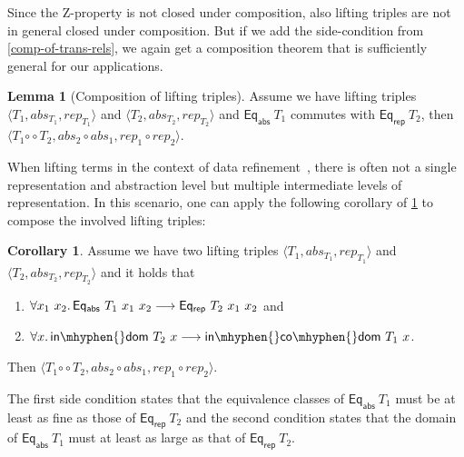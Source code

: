 \documentclass{article}
\theoremstyle{definition}
\newtheorem{lemma}[definition]{Lemma}
\newtheorem{corollary}[definition]{Corollary}
\newcommand{\relcomp}{\mathbin{\circ\circ}}
\newcommand{\indom}{\mathsf{in\mhyphen{}dom}}
\newcommand{\incodom}{\mathsf{in\mhyphen{}co\mhyphen{}dom}}
\newcommand{\eqrep}{\mathsf{Eq_{rep}}}
\newcommand{\eqabs}{\mathsf{Eq_{abs}}}
\begin{document}
Since the Z-property is not closed under composition,
also lifting triples are not in general closed under composition.
But if we add the side-condition from \cref{comp-of-trans-rels},
we again get a composition theorem that is sufficiently general for our applications.
\begin{lemma}[Composition of lifting triples]\label{lem:comp-of-lift-trips}
Assume we have lifting triples
$\langle T_1, abs_{T_1}, rep_{T_1} \rangle$ and $\langle T_2, abs_{T_2}, rep_{T_2} \rangle$
and \(\eqabs\ T_1\) commutes with \( \eqrep\ T_2 \),
then $\langle T_1 \relcomp T_2, abs_2 \circ abs_1, rep_1 \circ rep_2 \rangle$.
\end{lemma}

When lifting terms in the context of data refinement~\cite{haftmann2013data,lammich2013automatic},
there is often not a single representation and abstraction level
but multiple intermediate levels of representation.
In this scenario, one can apply the following corollary of \cref{lem:comp-of-lift-trips} to compose the involved lifting triples:
\begin{corollary}
Assume we have two lifting triples $\langle T_1, abs_{T_1}, rep_{T_1} \rangle$ and $\langle T_2, abs_{T_2}, rep_{T_2} \rangle$ and it holds that
\begin{enumerate}
	\item \(\forall x_1\ x_2\ldotp \eqabs\ T_1\ x_1\ x_2 \longrightarrow \eqrep\ T_2\ x_1\ x_2\) and
	\item \(\forall x\ldotp \indom\ T_2\ x \longrightarrow \incodom\ T_1\ x\).
\end{enumerate}
Then $\langle T_1 \relcomp T_2, abs_2 \circ abs_1, rep_1 \circ rep_2 \rangle$.
\end{corollary}
The first side condition states that the equivalence classes of \(\eqabs\ T_1\)
must be at least as fine as those of \(\eqrep\ T_2\)
and the second condition states that the domain of \(\eqabs\ T_1\) must at least as large as that of \(\eqrep\ T_2\).


\end{document}
